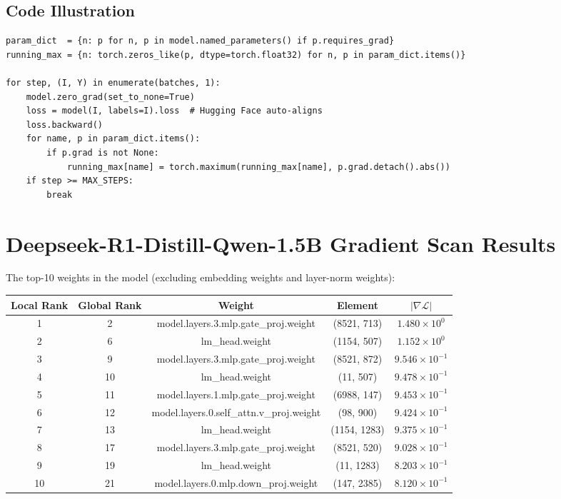 \documentclass[12pt]{article}
\begin{document}
\subsection*{Code Illustration}
\begin{lstlisting}[style=pycode]
param_dict  = {n: p for n, p in model.named_parameters() if p.requires_grad}
running_max = {n: torch.zeros_like(p, dtype=torch.float32) for n, p in param_dict.items()}

for step, (I, Y) in enumerate(batches, 1):
    model.zero_grad(set_to_none=True)
    loss = model(I, labels=I).loss  # Hugging Face auto-aligns
    loss.backward()
    for name, p in param_dict.items():
        if p.grad is not None:
            running_max[name] = torch.maximum(running_max[name], p.grad.detach().abs())
    if step >= MAX_STEPS:
        break
\end{lstlisting}

\section{Deepseek-R1-Distill-Qwen-1.5B Gradient Scan Results}
The top-10 weights in the model (excluding embedding weights and layer-norm weights):
\begin{table}[H]
\centering
\begin{tabular}{|c|c|c|c|c|}
\hline
Local Rank & Global Rank & Weight & Element & $|\nabla \mathcal{L}|$ \\
\hline
1  & 2  & model.layers.3.mlp.gate\_proj.weight & (8521, 713) & $1.480\times 10^{0}$ \\
2  & 6  & lm\_head.weight                      & (1154, 507) & $1.152\times 10^{0}$ \\
3  & 9  & model.layers.3.mlp.gate\_proj.weight & (8521, 872) & $9.546\times 10^{-1}$ \\
4  & 10 & lm\_head.weight                      & (11,   507) & $9.478\times 10^{-1}$ \\
5  & 11 & model.layers.1.mlp.gate\_proj.weight & (6988, 147) & $9.453\times 10^{-1}$ \\
6  & 12 & model.layers.0.self\_attn.v\_proj.weight & (98, 900) & $9.424\times 10^{-1}$ \\
7  & 13 & lm\_head.weight                      & (1154, 1283) & $9.375\times 10^{-1}$ \\
8  & 17 & model.layers.3.mlp.gate\_proj.weight & (8521, 520) & $9.028\times 10^{-1}$ \\
9  & 19 & lm\_head.weight                      & (11, 1283) & $8.203\times 10^{-1}$ \\
10 & 21 & model.layers.0.mlp.down\_proj.weight & (147, 2385) & $8.120\times 10^{-1}$ \\
\hline
\end{tabular}
\end{table}
\end{document}
